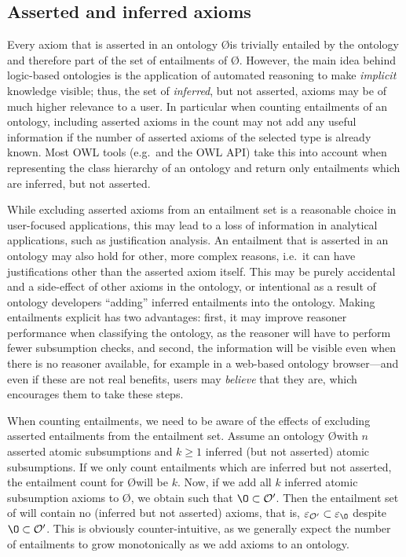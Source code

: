 \subsection{Asserted and inferred axioms}

Every axiom that is asserted in an ontology \O is trivially entailed by the ontology and therefore part of the set of entailments of \O. However, the main idea behind logic-based ontologies is the application of automated reasoning to make \emph{implicit} knowledge visible; thus, the set of \emph{inferred}, but not asserted, axioms may be of much higher relevance to a user. In particular when counting entailments of an ontology, including asserted axioms in the count may not add any useful information if the number of asserted axioms of the selected type is already known. Most OWL tools (e.g.\ \protege and the OWL API) take this into account when representing the class hierarchy of an ontology and return only entailments which are inferred, but not asserted.

While excluding asserted axioms from an entailment set is a reasonable choice in user-focused applications, this may lead to a loss of information in analytical applications, such as justification analysis. An entailment that is asserted in an ontology may also hold for other, more complex reasons, i.e.\ it can have justifications other than the asserted axiom itself. This may be purely accidental and a side-effect of other axioms in the ontology, or intentional as a result of ontology developers \enquote{adding} inferred entailments into the ontology. Making entailments explicit has two advantages: first, it may improve reasoner performance when classifying the ontology, as the reasoner will have to perform fewer subsumption checks, and second, the information will be visible even when there is no reasoner available, for example in a web-based ontology browser---and even if these are not real benefits, users may \emph{believe} that they are, which encourages them to take these steps. 

When counting entailments, we need to be aware of the effects of excluding asserted entailments from the entailment set. Assume an ontology \O with $n$ asserted atomic subsumptions and $k \geq 1$ inferred (but not asserted) atomic subsumptions. If we only count entailments which are inferred but not asserted, the entailment count for \O will be $k$. Now, if we add all $k$ inferred atomic subsumption axioms to \O, we obtain \oprime such that $\O \subset \oprime$. Then the entailment set of \oprime will contain no (inferred but not asserted) axioms, that is, $\varepsilon_{\oprime} \subset \varepsilon_{\O}$ despite $\O \subset \oprime$. This is obviously counter-intuitive, as we generally expect the number of entailments to grow monotonically as we add axioms to an ontology. 

